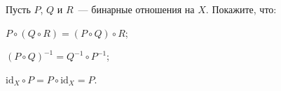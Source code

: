 Пусть $P$, $Q$ и $R$~--- бинарные отношения на $X$. Покажите, что:
\begin{enumcyr}
    \item $P \circ (Q \circ R) = (P \circ Q) \circ R$;
    \item $(P \circ Q)^{-1} = Q^{-1} \circ P^{-1}$;
    \item $\mathrm{id}_X \circ P = P \circ \mathrm{id}_X = P$.
\end{enumcyr}
